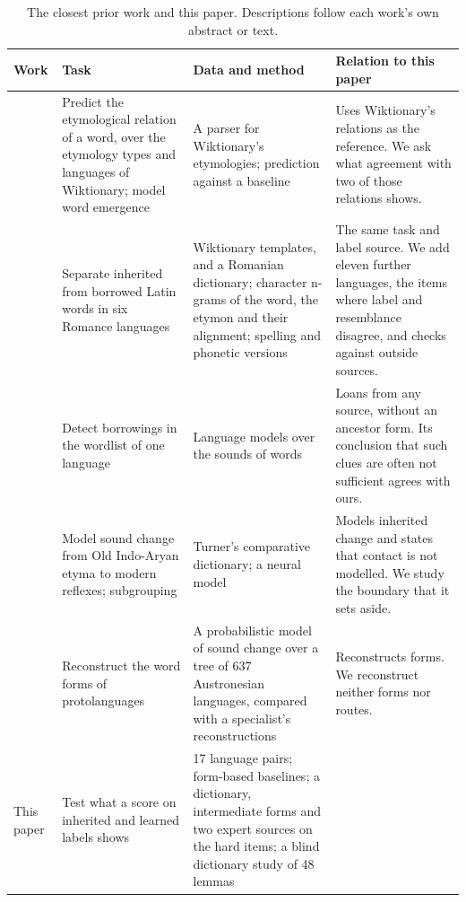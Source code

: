 \documentclass[11pt]{article}
\begin{document}
\begin{table}[t]
\centering\footnotesize
\begin{tabular}{p{}p{}p{}p{}}
\toprule
\textbf{Work} & \textbf{Task} & \textbf{Data and method} & \textbf{Relation to this paper} \\
\midrule
\citet{wu2020computational} & Predict the etymological relation of a word, over the etymology types and languages of Wiktionary; model word emergence & A parser for Wiktionary's etymologies; prediction against a baseline & Uses Wiktionary's relations as the reference. We ask what agreement with two of those relations shows. \\
\addlinespace
\citet{cristea2021inherited} & Separate inherited from borrowed Latin words in six Romance languages & Wiktionary templates, and a Romanian dictionary; character n-grams of the word, the etymon and their alignment; spelling and phonetic versions & The same task and label source. We add eleven further languages, the items where label and resemblance disagree, and checks against outside sources. \\
\addlinespace
\citet{miller2020lexical} & Detect borrowings in the wordlist of one language & Language models over the sounds of words & Loans from any source, without an ancestor form. Its conclusion that such clues are often not sufficient agrees with ours. \\
\addlinespace
\citet{cathcart2020disentangling} & Model sound change from Old Indo-Aryan etyma to modern reflexes; subgrouping & Turner's comparative dictionary; a neural model & Models inherited change and states that contact is not modelled. We study the boundary that it sets aside. \\
\addlinespace
\citet{bouchardcote2013automated} & Reconstruct the word forms of protolanguages & A probabilistic model of sound change over a tree of 637 Austronesian languages, compared with a specialist's reconstructions & Reconstructs forms. We reconstruct neither forms nor routes. \\
\midrule
This paper & Test what a score on inherited and learned labels shows & 17 language pairs; form-based baselines; a dictionary, intermediate forms and two expert sources on the hard items; a blind dictionary study of 48 lemmas & \\
\bottomrule
\end{tabular}
\caption{The closest prior work and this paper. Descriptions follow each work's own abstract or text.}
\label{tab:prior}
\end{table}
\end{document}
